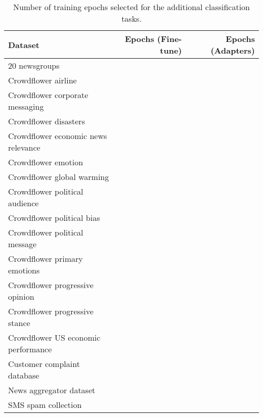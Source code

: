 \documentclass{article}
\begin{document}
\begin{table*}[ht]
\centering
\begin{adjustbox}{max width=\textwidth}
\begin{tabular}{l|rr}
\toprule
Dataset & Epochs (Fine-tune) & Epochs (Adapters) \\
\midrule
20 newsgroups &  &  \\
Crowdflower airline &  &  \\
Crowdflower corporate messaging &  &  \\
Crowdflower disasters &  &  \\
Crowdflower economic news relevance &  &  \\
Crowdflower emotion &  &  \\
Crowdflower global warming &  &  \\
Crowdflower political audience &  &  \\
Crowdflower political bias &  &  \\
Crowdflower political message &  &  \\
Crowdflower primary emotions &  &  \\
Crowdflower progressive opinion &  &  \\
Crowdflower progressive stance &  &  \\
Crowdflower US economic performance &  &  \\
Customer complaint database &  &  \\
News aggregator dataset &  &  \\
SMS spam collection &  &  \\
\bottomrule
\end{tabular}
\end{adjustbox}
\caption{Number of training epochs selected for the additional classification tasks.}
\label{tab:hub_epochs}
\end{table*}
\end{document}
